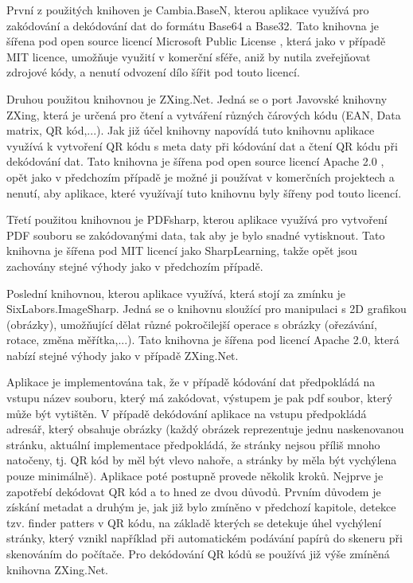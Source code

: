 \documentclass[conference]{IEEEtran}
\begin{document}
První z použitých knihoven je Cambia.BaseN, kterou aplikace využívá pro zakódování a dekódování dat do formátu Base64 a Base32. Tato knihovna je šířena pod open source licencí Microsoft Public License \cite{MicrosoftPublicLicense}, která jako v případě MIT licence, umožňuje využití v komerční sféře, aniž by nutila zveřejňovat zdrojové kódy, a nenutí odvození dílo šířit pod touto licencí.

Druhou použitou knihovnou je ZXing.Net. Jedná se o port Javovské knihovny ZXing, která je určená pro čtení a vytváření různých čárových kódu (EAN, Data matrix, QR kód,...). Jak již účel knihovny napovídá tuto knihovnu aplikace využívá k vytvoření QR kódu s meta daty při kódování dat a čtení QR kódu při dekódování dat. Tato knihovna je šířena pod open source licencí Apache 2.0 \cite{ApacheLicense}, opět jako v předchozím případě je možné ji používat v komerčních projektech a nenutí, aby aplikace, které využívají tuto knihovnu byly šířeny pod touto licencí.

Třetí použitou knihovnou je PDFsharp, kterou aplikace využívá pro vytvoření PDF souboru se zakódovanými data, tak aby je bylo snadné vytisknout. Tato knihovna je šířena pod MIT licencí jako SharpLearning, takže opět jsou zachovány stejné výhody jako v předchozím případě.

Poslední knihovnou, kterou aplikace využívá, která stojí za zmínku je SixLabors.ImageSharp. Jedná se o knihovnu sloužící pro manipulaci s 2D grafikou (obrázky), umožňující dělat různé pokročilejší operace s obrázky (ořezávání, rotace, změna měřítka,...). Tato knihovna je šířena pod licencí Apache 2.0, která nabízí stejné výhody jako v případě ZXing.Net.

Aplikace je implementována tak, že v případě kódování dat předpokládá na vstupu název souboru, který má zakódovat, výstupem je pak pdf soubor, který může být vytištěn. V případě dekódování aplikace na vstupu předpokládá adresář, který obsahuje obrázky (každý obrázek reprezentuje jednu naskenovanou stránku, aktuální implementace předpokládá, že stránky nejsou příliš mnoho natočeny, tj. QR kód by měl být vlevo nahoře, a stránky by měla být vychýlena pouze minimálně). Aplikace poté postupně provede několik kroků. Nejprve je zapotřebí dekódovat QR kód a to hned ze dvou důvodů. Prvním důvodem je získání metadat a druhým je, jak již bylo zmíněno v předchozí kapitole, detekce tzv. finder patters v QR kódu, na základě kterých se detekuje úhel vychýlení stránky, který vznikl například při automatickém podávání papírů do skeneru při skenováním do počítače. Pro dekódování QR kódů se používá již výše zmíněná knihovna ZXing.Net. 
\end{document}
